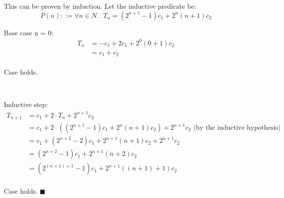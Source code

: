 \documentclass[12pt, letterpaper, twoside]{article}
\begin{document}
This can be proven by induction.  Let the inductive predicate be:
\[ P(n) ::= \forall n \in N .\text{ } T_n = (2^{n+1} - 1) c_1 + 2^n (n+1) c_2   \]

Base case n = 0:
\begin{equation} \label{eq7}
    \begin{split}
    T_n & = -c_1 + 2 c_1 + 2^0 (0+1) c_2 \\
    & = c_1 + c_2 \\
\end{split}
\end{equation}

Case holds.

\

Inductive step:
\begin{equation} \label{eq7}
    \begin{split}
    T_{n+1} & = c_1 + 2 \cdot T_{n} + 2^{n+1} c_2 \\
    & = c_1 + 2 \cdot ((2^{n+1} -1) c_1 + 2^n (n+1) c_2) + 2^{n+1} c_2 \text{ (by the inductive hypothesis)} \\
    & = c_1 + (2^{n+2} -2) c_1 + 2^{n+1} (n+1) c_2 + 2^{n+1} c_2  \\
    & = (2^{n+2} -1) c_1 + 2^{n+1} (n+2) c_2  \\
    & = (2^{(n+1)+1} -1) c_1 + 2^{n+1} ((n+1)+1) c_2  \\
\end{split}
\end{equation}

Case holds. $ \blacksquare $
\end{document}
